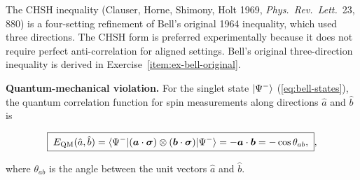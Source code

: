 \begin{note}
The CHSH inequality (Clauser, Horne, Shimony, Holt 1969, \textit{Phys.\ Rev.\ Lett.}\ 23, 880) is a four-setting refinement of Bell's original 1964 inequality, which used three directions. The CHSH form is preferred experimentally because it does not require perfect anti-correlation for aligned settings. Bell's original three-direction inequality is derived in Exercise~\ref{item:ex-bell-original}.
\end{note}

\medskip\noindent\textbf{Quantum-mechanical violation.}
For the singlet state $\ket{\Psi^-}$ (\eqref{eq:bell-states}), the quantum correlation function for spin measurements along directions $\hat{a}$ and $\hat{b}$ is
\begin{linenomath}
\begin{equation}
\boxed{\;
E_{\text{QM}}(\hat{a},\hat{b})
= \braket{\Psi^-|(\bm a \cdot \bm \sigma) \otimes (\bm b \cdot \bm \sigma)|\Psi^-}
= -\bm a \cdot \bm b = -\cos\theta_{ab},
\;},
\label{eq:qm-correlation-singlet}
\end{equation}
\end{linenomath}
where $\theta_{ab}$ is the angle between the unit vectors $\hat{a}$ and $\hat{b}$.

